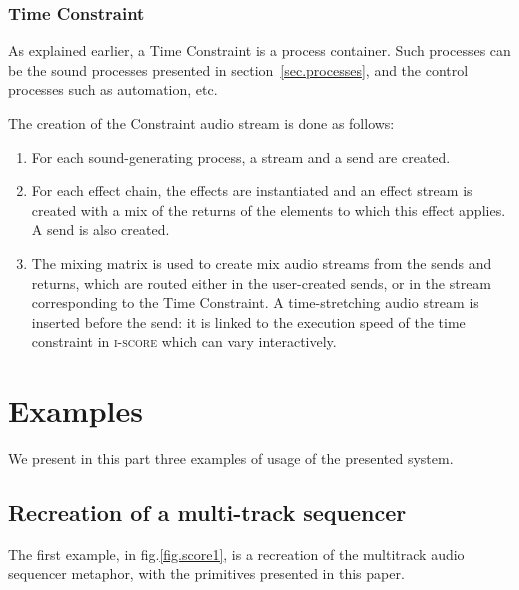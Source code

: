 \documentclass{article}
\newcommand*{\iscore}{\textsc{i-score}\xspace}
\begin{document}
\subsubsection{Time Constraint}
As explained earlier, a Time Constraint is a process container.
Such processes can be the sound processes presented in section~\ref{sec.processes}, and 
the control processes such as automation, etc.

The creation of the Constraint audio stream is done as follows: 
\begin{enumerate}
    \item For each sound-generating process, a stream and a send are created.
    \item For each effect chain, the effects are instantiated and an effect stream is created with a mix of the returns of the elements to which this effect applies.
    A send is also created.
    \item The mixing matrix is used to create mix audio streams from the sends and returns, which are routed either in the user-created sends, or in the stream corresponding to the Time Constraint.
    A time-stretching audio stream is inserted before the send: it is linked to the execution speed of the time constraint in \iscore which can vary interactively.
\end{enumerate} 





\section{Examples}
We present in this part three examples of usage of the presented system.

\subsection{Recreation of a multi-track sequencer}
The first example, in fig.\ref{fig.score1}, is a recreation of the multitrack audio sequencer metaphor, with the primitives presented in this paper.
 
\end{document}
